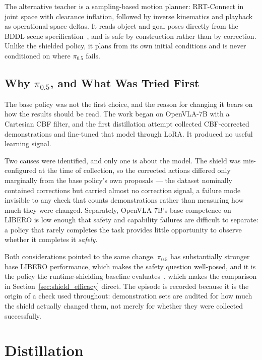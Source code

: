 The alternative teacher is a sampling-based motion planner: RRT-Connect in joint space with
clearance inflation, followed by inverse kinematics and playback as operational-space deltas. It
reads object and goal poses directly from the BDDL scene specification~\cite{liu2023libero}, and is
safe by construction rather than by correction. Unlike the shielded policy, it plans from its own
initial conditions and is never conditioned on where $\pi_{0.5}$ fails.

\subsection{Why \texorpdfstring{$\pi_{0.5}$}{pi 0.5}, and What Was Tried First}
\label{sec:base_choice}

The base policy was not the first choice, and the reason for changing it bears on how the results
should be read. The work began on OpenVLA-7B with a Cartesian CBF filter, and the first
distillation attempt collected CBF-corrected demonstrations and fine-tuned that model through LoRA.
It produced no useful learning signal.

Two causes were identified, and only one is about the model. The shield was mis-configured at the
time of collection, so the corrected actions differed only marginally from the base policy's own
proposals --- the dataset nominally contained corrections but carried almost no correction signal,
a failure mode invisible to any check that counts demonstrations rather than measuring how much
they were changed. Separately, OpenVLA-7B's base competence on LIBERO is low enough that safety and
capability failures are difficult to separate: a policy that rarely completes the task provides
little opportunity to observe whether it completes it \emph{safely}.

Both considerations pointed to the same change. $\pi_{0.5}$ has substantially stronger base LIBERO
performance, which makes the safety question well-posed, and it is the policy the runtime-shielding
baseline evaluates~\cite{vlsa2026}, which makes the comparison in
Section~\ref{sec:shield_efficacy} direct. The episode is recorded because it is the origin of a
check used throughout: demonstration sets are audited for how much the shield actually changed
them, not merely for whether they were collected successfully.

\section{Distillation}\label{sec:distillation}

